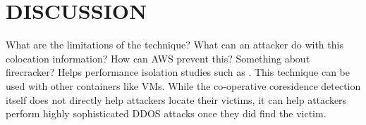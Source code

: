 \section{DISCUSSION}
\label{sec:discussion}
\todo{}
What are the limitations of the technique? What can an attacker 
do with this colocation information? How can AWS prevent this? 
Something about firecracker? Helps performance isolation 
studies such as \cite{wangusenix2018}.
This technique can be used with other containers 
like VMs. While the co-operative coresidence detection itself 
does not directly help attackers locate their victims, it can 
help attackers perform highly sophisticated DDOS attacks once 
they did find the victim. 
